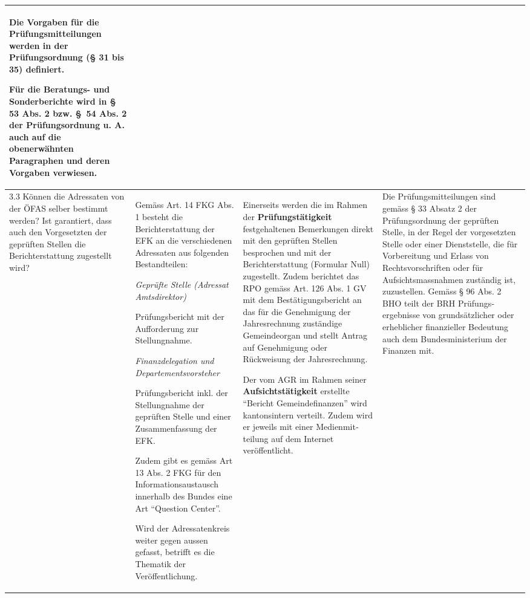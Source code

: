 \documentclass[10pt]{article}
\begin{document}
\begin{landscape}
\begin{center}
\begin{longtable}{|p{4cm}|p{5cm}|p{7.5cm}|p{7.5cm}|}
Die Vorgaben für die Prüfungsmitteilungen werden in der Prüfungsordnung (§ 31 bis 35) definiert.

Für die Beratungs- und Sonder­berichte wird in § 53 Abs. 2 bzw. §~54 Abs. 2 der Prüfungsordnung u. A. auch auf die obenerwähnten Paragraphen und deren Vorgaben verwiesen.

 \\
\hline
3.3 Können die Adressaten von der ÖFAS selber bestimmt werden? Ist garantiert, dass auch den Vorgesetzten der geprüften Stellen die Berichterstattung zugestellt wird? & Gemäss Art. 14 FKG Abs. 1 besteht die Berichterstattung der EFK an die verschiedenen Adressaten aus folgenden Bestandteilen:

\textit{Geprüfte Stelle (Adressat Amtsdirektor)}

Prüfungsbericht mit der Aufforderung zur Stellungnahme.

\textit{Finanzdelegation und Departementsvorsteher}

Prüfungsbericht inkl. der Stellungnahme der geprüften Stelle und einer Zusammen­fassung der EFK.

Zudem gibt es gemäss Art 13 Abs. 2 FKG für den Informationsaustausch innerhalb des Bundes eine Art “{}Question Center”{}.

Wird der Adressatenkreis weiter gegen aussen gefasst, betrifft es die Thematik der Veröffentlichung.

 & Einerseits werden die im Rahmen der \textbf{Prüfungstätigkeit} festgehaltenen Bemerkungen direkt mit den geprüften Stellen besprochen und mit der Berichterstattung (Formular Null) zugestellt. Zudem berichtet das RPO gemäss Art. 126 Abs. 1 GV mit dem Bestätigungsbericht an das für die Genehmigung der Jahresrechnung zuständige Gemeindeorgan und stellt Antrag auf Genehmigung oder Rückweisung der Jahresrechnung. 

Der vom AGR im Rahmen seiner \textbf{Aufsichtstätigkeit} erstellte “{}Bericht Gemeindefinanzen”{} wird kantonsintern verteilt. Zudem wird er jeweils mit einer Medien­mit­teilung auf dem Internet veröffentlicht.

 & Die Prüfungsmitteilungen sind gemäss § 33 Absatz 2 der Prüfungsordnung der geprüften Stelle, in der Regel der vorgesetzten Stelle oder einer Dienststelle, die für Vorbereitung und Erlass von Rechtsvorschriften oder für Aufsichtsmassnahmen zuständig ist, zuzustellen. Gemäss § 96 Abs. 2 BHO teilt der BRH Prüfungs­ergebnisse von grund­sätzlicher oder erheblicher finanzieller Bedeutung auch dem Bundesministerium der Finanzen mit.


\end{longtable}
\end{center}
\end{landscape}
\end{document}
